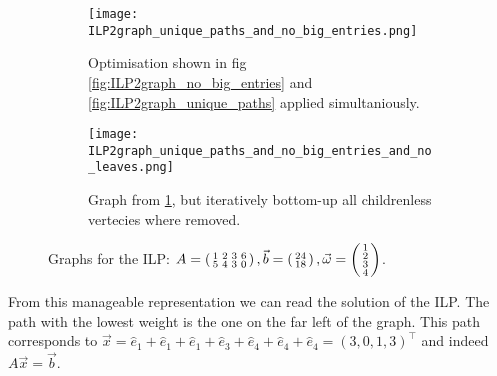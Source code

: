 \begin{figure}[b]
    \centering
    \begin{subfigure}[b]{0.45\textwidth}
        \texttt{[image: ILP2graph\_unique\_paths\_and\_no\_big\_entries.png]}
        \caption{Optimisation shown in fig \ref{fig:ILP2graph_no_big_entries} and \ref{fig:ILP2graph_unique_paths} applied simultaniously.}
        \label{fig:ILP2graph_unique_paths_and_no_big_entries}
    \end{subfigure}
    \hfill
    \begin{subfigure}[b]{0.45\textwidth}
        \centering
        \texttt{[image: ILP2graph\_unique\_paths\_and\_no\_big\_entries\_and\_no\_leaves.png]}
        \caption{Graph from \ref{fig:ILP2graph_unique_paths_and_no_big_entries}, but iteratively bottom-up all childrenless vertecies where removed.}
        \label{fig:ILP2graph_unique_paths_and_no_big_entries_and_no_leaves}
    \end{subfigure}
    \caption{Graphs for the ILP: $A = \left(\begin{smallmatrix}1&2&3&6\\5&4&3&0\end{smallmatrix}\right), \vec b = \left(\begin{smallmatrix}24\\18\end{smallmatrix}\right), \vec \omega = \left(\begin{smallmatrix}1\\2\\3\\4\end{smallmatrix}\right)$.}
\end{figure}


From this manageable representation we can read the solution of the ILP. The path with the lowest weight is the one on the far left of the graph. This path corresponds to $\vec x = \hat e_1 + \hat e_1 + \hat e_1 + \hat e_3 + \hat e_4 + \hat e_4 + \hat e_4 = (3, 0, 1, 3)^\top$ and indeed $A\vec x = \vec b$. 

